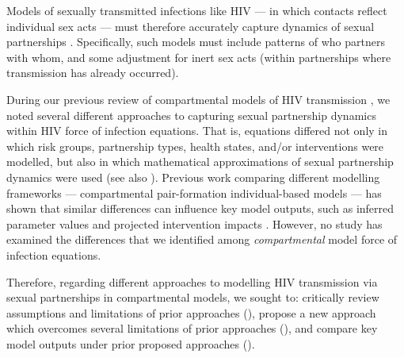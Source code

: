 Models of sexually transmitted infections like HIV
--- in which contacts reflect individual sex acts ---
must therefore accurately capture dynamics of sexual partnerships \cite{Rao2021}.
Specifically, such models must include patterns of who partners with whom, and
some adjustment for inert sex acts (within partnerships where transmission has already occurred).
\par
During our previous review of compartmental models of HIV transmission \cite{Knight2022sr},
we noted several different approaches to capturing sexual partnership dynamics
within HIV force of infection equations.
That is, equations differed not only in which
risk groups, partnership types, health states, and/or interventions were modelled,
but also in which mathematical approximations of sexual partnership dynamics were used
(see also \cite{Rao2021}).
Previous work comparing different modelling frameworks
--- \ie compartmental \vs pair-formation \vs individual-based models ---
has shown that similar differences can influence key model outputs,
such as inferred parameter values and projected intervention impacts
\cite{Kretzschmar1998,Eames2002,Lloyd-Smith2004,Johnson2016mf}.
However, no study has examined the differences that we identified
among \emph{compartmental} model force of infection equations.
\par\pagebreak %
Therefore, regarding different approaches to modelling HIV transmission
via sexual partnerships in compartmental models, we sought to:
critically review assumptions and limitations of prior approaches (),
propose a new approach which overcomes several limitations of prior approaches (),
and compare key model outputs under prior \vs proposed approaches ().
